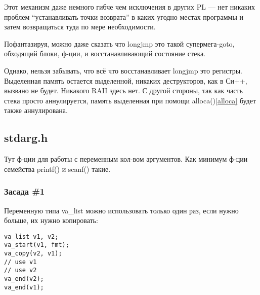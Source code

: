 Этот механизм даже немного гибче чем исключения в других \ac{PL} --- нет никаких проблем ``устанавливать точки 
возврата'' в каких угодно местах программы и затем возвращаться туда по мере необходимости.

\label{goto}
Пофантазируя, можно даже сказать что longjmp это такой супермега-goto, обходящий блоки, ф-ции, и восстанавливающий
состояние стека.

Однако, нельзя забывать, что всё что восстанавливает longjmp это регистры. Выделенная память остается выделенной,
никаких деструкторов, как в Си++, вызвано не будет. Никакого \ac{RAII} здесь нет. 
С другой стороны, так как часть стека просто аннулируется, 
память выделенная при помощи alloca()\ref{alloca} будет также аннулирована.

\subsection{stdarg.h}

Тут ф-ции для работы с переменным кол-вом аргументов. Как минимум ф-ции семейства printf() и scanf() такие.

\subsubsection{Засада \#1}

Переменную типа va\_list можно использовать только один раз, если нужно больше, их нужно копировать:

\begin{lstlisting}
va_list v1, v2;
va_start(v1, fmt);
va_copy(v2, v1);
// use v1
// use v2
va_end(v2);
va_end(v1);
\end{lstlisting}

